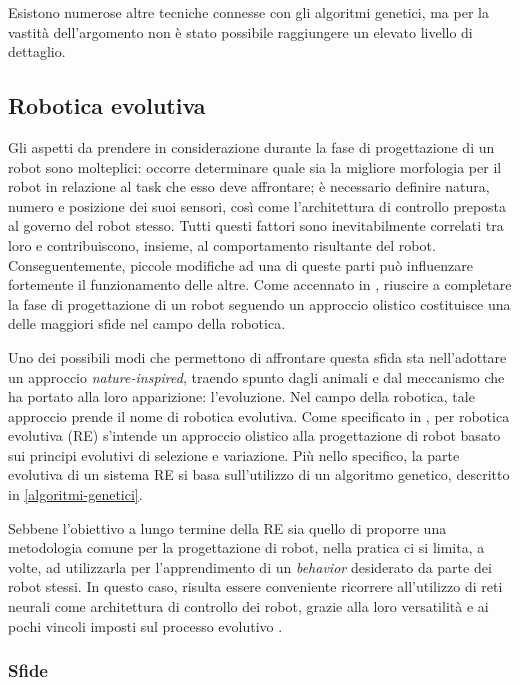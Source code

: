 \documentclass[a4paper,12pt]{article}
\begin{document}
Esistono numerose altre tecniche connesse con gli algoritmi genetici, ma per la vastità dell'argomento non è stato possibile raggiungere un elevato livello di dettaglio.

\subsection{Robotica evolutiva}

Gli aspetti da prendere in considerazione durante la fase di progettazione di un robot sono molteplici: occorre determinare quale sia la migliore morfologia per il robot in relazione al task che esso deve affrontare; è necessario definire natura, numero e posizione dei suoi sensori, così come l'architettura di controllo preposta al governo del robot stesso. Tutti questi fattori sono inevitabilmente correlati tra loro e contribuiscono, insieme, al comportamento risultante del robot. Conseguentemente, piccole modifiche ad una di queste parti può influenzare fortemente il funzionamento delle altre. Come accennato in \cite{ERWWW}, riuscire a completare la fase di progettazione di un robot seguendo un approccio olistico costituisce una delle maggiori sfide nel campo della robotica.  

Uno dei possibili modi che permettono di affrontare questa sfida sta nell'adottare un approccio \emph{nature-inspired}, traendo spunto dagli animali e dal meccanismo che ha portato alla loro apparizione: l'evoluzione. Nel campo della robotica, tale approccio prende il nome di robotica evolutiva. Come specificato in \cite{ERNolfi}, per robotica evolutiva (RE) s'intende un approccio olistico alla progettazione di robot basato sui principi evolutivi di selezione e variazione. Più nello specifico, la parte evolutiva di un sistema RE si basa sull'utilizzo di un algoritmo genetico, descritto in \autoref{algoritmi-genetici}. 

Sebbene l'obiettivo a lungo termine della RE sia quello di proporre una metodologia comune per la progettazione di robot, nella pratica ci si limita, a volte, ad utilizzarla per l'apprendimento di un \emph{behavior} desiderato da parte dei robot stessi. In questo caso, risulta essere conveniente ricorrere all'utilizzo di reti neurali come architettura di controllo dei robot, grazie alla loro versatilità e ai pochi vincoli imposti sul processo evolutivo \cite{ERWWW}.

\subsubsection{Sfide}
\end{document}
